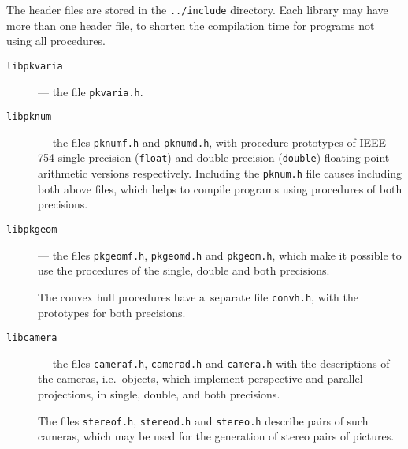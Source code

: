 The header files are stored in the \texttt{../include} directory.
Each library may have more than one header file, to shorten the compilation
time for programs not using all procedures.
\begin{description}
\item[\texttt{libpkvaria}]--- the file \texttt{pkvaria.h}.
\item[\texttt{libpknum}]--- the files \texttt{pknumf.h} and \texttt{pknumd.h},
with procedure prototypes of IEEE-754 single precision (\texttt{float})
and double precision (\texttt{double}) floating-point arithmetic
versions respectively. Including the \texttt{pknum.h} file causes
including both above files, which helps to compile programs using procedures
of both precisions. 
\item[\texttt{libpkgeom}]--- the files \texttt{pkgeomf.h}, \texttt{pkgeomd.h} and
\texttt{pkgeom.h}, which make it possible to use the procedures of the
single, double and both precisions.

The convex hull procedures have a~separate file
\texttt{convh.h}, with the prototypes for both precisions.
\item[\texttt{libcamera}]--- the files \texttt{cameraf.h}, \texttt{camerad.h}
and \texttt{camera.h} with the descriptions of the cameras,
i.e.\ objects, which implement perspective and parallel projections,
in single, double, and both precisions.

The files \texttt{stereof.h}, \texttt{stereod.h} and \texttt{stereo.h}
describe pairs of such cameras, which may be used for the generation of
stereo pairs of pictures.


\end{description}
